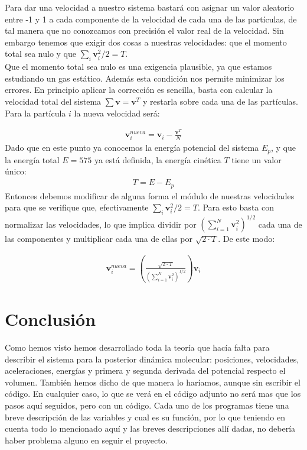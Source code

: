 \documentclass[11pt]{article}
\newcommand{\vn}{\mathbf{v}}
\newcommand{\parentesis}[1]{\left( #1  \right)}
\begin{document}
Para dar una velocidad a nuestro sistema bastará con asignar un valor aleatorio entre -1 y 1 a cada componente de la velocidad de cada una de las partículas, de tal manera que no conozcamos con precisión el valor real de la velocidad. Sin embargo tenemos que exigir dos cosas a nuestras velocidades: que el momento total sea nulo y que $\sum_i \vn_i^2/2 = T$. \\


Que el momento total sea nulo es una exigencia plausible, ya que estamos estudiando un gas estático. Además esta condición nos permite minimizar los errores. En principio aplicar la corrección es sencilla, basta con calcular la velocidad total del sistema $ \sum \vn = \vn^{T}$ y restarla sobre cada una de las partículas. Para la partícula $i$ la nueva velocidad será:

\begin{eqnarray}
	\vn_i^{nueva} = \vn_i - \frac{\vn^T}{N}
\end{eqnarray}
Dado que en este punto ya conocemos la energía potencial del sistema $E_p$, y que la energía total $E=575$ ya está definida, la energía cinética $T$ tiene un valor único:
\begin{eqnarray}
	T=E-E_p
\end{eqnarray}
Entonces debemos modificar de alguna forma el módulo de nuestras velocidades para que se verifique que, efectivamente $\sum_i \vn_i^2/2 = T$. Para esto basta con normalizar las velocidades, lo que implica dividir por $\parentesis{\sum_{i=1}^N\vn^2_i}^{1/2}$ cada una de las componentes y multiplicar cada una de ellas por $\sqrt{2\cdot T}$. De este modo:

\begin{eqnarray}
	\vn_i^{nueva} = \parentesis{\frac{\sqrt{2\cdot T}}{\parentesis{\sum_{i=1}^N\vn^2_i}^{1/2}}} \vn_i 
\end{eqnarray}
	 
\section{Conclusión}

Como hemos visto hemos desarrollado toda la teoría que hacía falta para describir el sistema para la posterior dinámica molecular: posiciones, velocidades, aceleraciones, energías y primera y segunda derivada del potencial respecto el volumen. También hemos dicho de que manera lo haríamos, aunque sin escribir el código. En cualquier caso, lo que se verá en el código adjunto no será mas que los pasos aquí seguidos, pero con un código. Cada uno de los programas tiene una breve descripción de las variables y cual es su función, por lo que teniendo en cuenta todo lo mencionado aquí y las breves descripciones allí dadas, no debería haber problema alguno en seguir el proyecto.
	 
\end{document}
